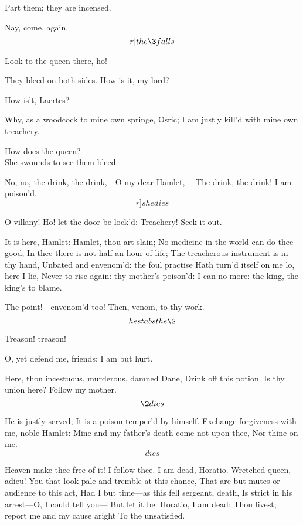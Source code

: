 \documentclass[11pt]{book}
\begin{document}
\2	Part them; they are incensed.

\1	Nay, come, again. \\	\[r]the \3 falls\]

	                  Look to the queen there, ho!

\6	They bleed on both sides. How is it, my lord?

	How is't, Laertes?

\7	Why, as a woodcock to mine own springe, Osric;
	I am justly kill'd with mine own treachery.

\1	How does the queen? \\

\2	She swounds to see them bleed.

\3	No, no, the drink, the drink,---O my dear Hamlet,---
	The drink, the drink! I am poison'd. \[r]she dies\]

\1	O villany! Ho! let the door be lock'd:
	Treachery! Seek it out.

\7	It is here, Hamlet: Hamlet, thou art slain;
	No medicine in the world can do thee good;
	In thee there is not half an hour of life;
	The treacherous instrument is in thy hand,
	Unbated and envenom'd: the foul practise
	Hath turn'd itself on me lo, here I lie,
	Never to rise again: thy mother's poison'd:
	I can no more: the king, the king's to blame.

\1	The point!---envenom'd too!
	Then, venom, to thy work. 	\[he stabs the \2\]

	Treason! treason!

\2	O, yet defend me, friends; I am but hurt.

\1	Here, thou incestuous, murderous, damned Dane,
	Drink off this potion. Is thy union here?
	Follow my mother. \\\[\2 dies\]

\7	                  He is justly served;
	It is a poison temper'd by himself.
	Exchange forgiveness with me, noble Hamlet:
	Mine and my father's death come not upon thee,
	Nor thine on me. \[dies\]

\1	Heaven make thee free of it! I follow thee.
	I am dead, Horatio. Wretched queen, adieu!
	You that look pale and tremble at this chance,
	That are but mutes or audience to this act,
	Had I but time---as this fell sergeant, death,
	Is strict in his arrest---O, I could tell you---
	But let it be. Horatio, I am dead;
	Thou livest; report me and my cause aright
	To the unsatisfied. \\
\end{document}
